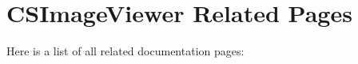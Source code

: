 \section{CSImage\-Viewer Related Pages}
Here is a list of all related documentation pages:\begin{CompactList}
\item {}

\end{CompactList}
